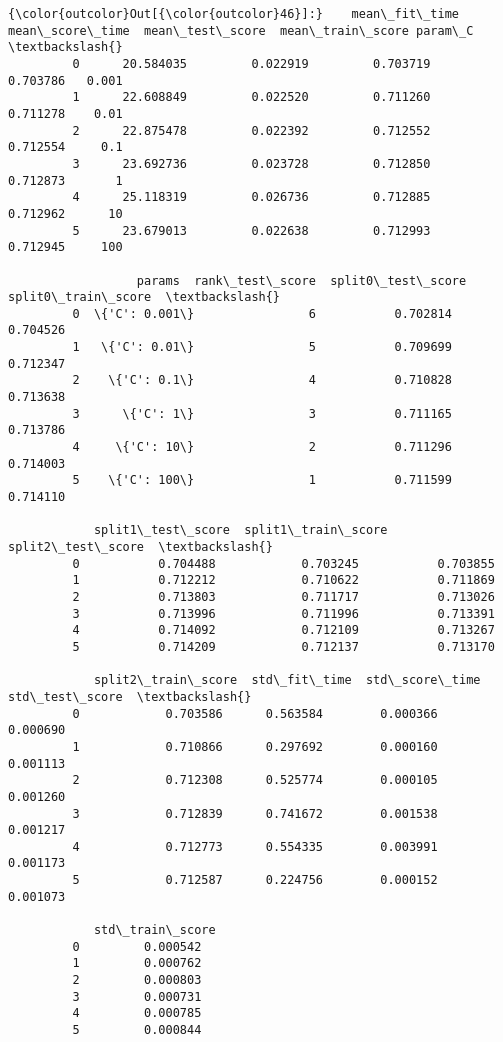 \documentclass[11pt]{article}
\begin{document}
            \begin{Verbatim}[commandchars=\\\{\}]
{\color{outcolor}Out[{\color{outcolor}46}]:}    mean\_fit\_time  mean\_score\_time  mean\_test\_score  mean\_train\_score param\_C  \textbackslash{}
         0      20.584035         0.022919         0.703719          0.703786   0.001   
         1      22.608849         0.022520         0.711260          0.711278    0.01   
         2      22.875478         0.022392         0.712552          0.712554     0.1   
         3      23.692736         0.023728         0.712850          0.712873       1   
         4      25.118319         0.026736         0.712885          0.712962      10   
         5      23.679013         0.022638         0.712993          0.712945     100   
         
                  params  rank\_test\_score  split0\_test\_score  split0\_train\_score  \textbackslash{}
         0  \{'C': 0.001\}                6           0.702814            0.704526   
         1   \{'C': 0.01\}                5           0.709699            0.712347   
         2    \{'C': 0.1\}                4           0.710828            0.713638   
         3      \{'C': 1\}                3           0.711165            0.713786   
         4     \{'C': 10\}                2           0.711296            0.714003   
         5    \{'C': 100\}                1           0.711599            0.714110   
         
            split1\_test\_score  split1\_train\_score  split2\_test\_score  \textbackslash{}
         0           0.704488            0.703245           0.703855   
         1           0.712212            0.710622           0.711869   
         2           0.713803            0.711717           0.713026   
         3           0.713996            0.711996           0.713391   
         4           0.714092            0.712109           0.713267   
         5           0.714209            0.712137           0.713170   
         
            split2\_train\_score  std\_fit\_time  std\_score\_time  std\_test\_score  \textbackslash{}
         0            0.703586      0.563584        0.000366        0.000690   
         1            0.710866      0.297692        0.000160        0.001113   
         2            0.712308      0.525774        0.000105        0.001260   
         3            0.712839      0.741672        0.001538        0.001217   
         4            0.712773      0.554335        0.003991        0.001173   
         5            0.712587      0.224756        0.000152        0.001073   
         
            std\_train\_score  
         0         0.000542  
         1         0.000762  
         2         0.000803  
         3         0.000731  
         4         0.000785  
         5         0.000844  
\end{Verbatim}
        
\end{document}
